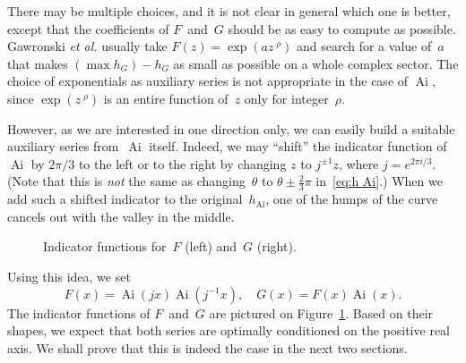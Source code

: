 \documentclass[10pt, conference]{IEEEtran}
\DeclareMathOperator{\Ai}{Ai}
\begin{document}
There may be multiple choices, and it is not clear in general which one is better, except that the coefficients of $F$~and~$G$ should be as easy to compute as possible.
Gawronski {\emph{et al.}} usually take $F(z) = \exp(
az^{\;\rho})$ and search for a value of~$a$ that makes $(\max h_G
) - h_G$ as small as possible on a whole complex sector. The choice of
exponentials as auxiliary series is not appropriate in the case of
$\Ai$, since $\exp(z^{\;\rho})$ is an entire function of~$z$
only for integer~$\rho$.


However, as we are interested in one direction only, we can easily build a
suitable auxiliary series from~$\Ai$ itself. Indeed, we may ``shift''
the indicator function of~$\Ai$ by $2 \pi / 3$ to the left or to the
right by changing $z$ to $j^{\pm 1} z$, where $j = e^{2 \pi i / 3}$. (Note
that this is {\emph{not}} the same as changing~$\theta$ to $\theta \pm
\frac{2}{3} \pi$ in~\eqref{eq:h Ai}.) When we add such a shifted
indicator to the original~$h_{\Ai}$, one of the humps of the curve cancels out with
the valley in the middle.

\begin{figure}
  \hfill
  \caption{Indicator functions for~$F$ (left) and~$G$ (right).\label{fig:h F G}}
\end{figure}

Using this idea, we set
\begin{equation}
  F(x) = \Ai(jx) \Ai(j^{- 1} x), \hspace{1em} G(x) = F(x) \Ai (x).
  \label{eq:def F G}
\end{equation}
The indicator functions of $F$~and~$G$ are pictured on Figure~\ref{fig:h F G}.
Based on their shapes, we expect that both series are optimally conditioned on
the positive real axis.
We shall prove that this is indeed the case in the
next two sections.
\end{document}
